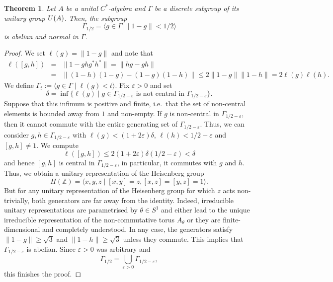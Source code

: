 \documentclass[11pt]{amsproc}
\theoremstyle{plain}
\newtheorem{theorem}{Theorem}[section]
\theoremstyle{remark}
\begin{document}
\begin{theorem}\label{cstar}
Let $A$ be a unital $C^*$-algebra and $\Gamma$ be a discrete subgroup of its unitary group ${\rm U}(A)$. Then, the subgroup
$$\Gamma_{1/2} = \langle g \in \Gamma \mid \|1-g\|<1/2 \rangle$$
is abelian and normal in $\Gamma$.
\end{theorem}
\begin{proof}
We set $\ell(g)=\|1-g\|$ and note that
\begin{eqnarray*} \ell([g,h]) &=& \|1-ghg^*h^*\| = \|hg-gh\| \\
&=& \|(1-h)(1-g)-(1-g)(1-h)\| \leq 2 \|1-g\|\|1-h\| = 2 \ell(g) \ell(h).
\end{eqnarray*}
We define $\Gamma_{t} := \langle g \in \Gamma \mid \ell(g)<t \rangle$. 
Fix $\varepsilon>0$ and set
$$\delta = \inf\{\ell(g) \mid g \in \Gamma_{1/2-\varepsilon} \mbox{ is not central in } \Gamma_{1/2-\varepsilon}\}.$$
Suppose that this infimum is positive and finite, i.e.\ that the set of non-central elements is bounded away from $1$ and non-empty. If $g$ is non-central in $\Gamma_{1/2-\varepsilon}$, then it cannot commute with the entire generating set of $\Gamma_{1/2-\varepsilon}$. Thus, we can consider $g,h \in \Gamma_{1/2-\varepsilon}$ with $\ell(g) < (1+2\varepsilon)\delta$, $\ell(h)<1/2 - \varepsilon$ and $[g,h] \neq 1$. We compute $$\ell([g,h]) \leq 2 (1+2\varepsilon)\delta (1/2-\varepsilon)<\delta$$ and hence $[g,h]$ is central in $\Gamma_{1/2-\varepsilon}$, in particular, it commutes with $g$ and $h$. Thus, we obtain a unitary representation of the Heisenberg group
$$H(\mathbb Z) = \langle x,y,z \mid [x,y]=z, [x,z]=[y,z]=1 \rangle.$$ But for any unitary representation of the Heisenberg group for which $z$ acts non-trivially, both generators are far away from the identity. Indeed, irreducible unitary representations are parametrised by $\theta \in S^1$ and either lead to the unique irreducible representation of the non-commutative torus $A_{\theta}$ or they are finite-dimensional and completely understood. In any case, the generators satisfy $\|1-g\| \geq \sqrt{3}$ and $\|1-h\| \geq \sqrt{3}$ unless they commute. This implies that $\Gamma_{1/2-\varepsilon}$ is abelian. Since $\varepsilon>0$ was arbitrary and $$\Gamma_{1/2} = \bigcup_{\varepsilon>0} \Gamma_{1/2-\varepsilon},$$
this finishes the proof.
\end{proof}
\end{document}
